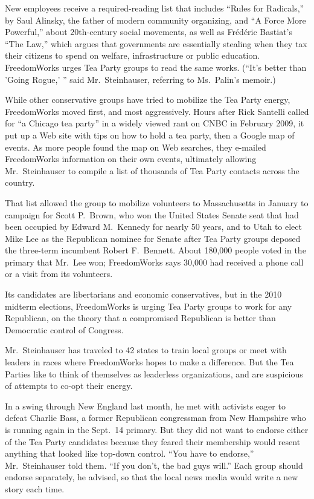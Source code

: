 ﻿\documentclass[12pt]{article}
\begin{document}
New employees receive a required-reading list that includes ``Rules for Radicals,'' by Saul Alinsky,
the father of modern community organizing, and ``A Force More Powerful,'' about 20th-century social
movements, as well as Fr\'ed\'eric Bastiat's ``The Law,'' which argues that governments are
essentially stealing when they tax their citizens to spend on welfare, infrastructure or public
education. FreedomWorks urges Tea Party groups to read the same works. (``It's better than 'Going
Rogue,' '' said Mr.~Steinhauser, referring to Ms.~Palin's memoir.)

While other conservative groups have tried to mobilize the Tea Party energy, FreedomWorks moved
first, and most aggressively. Hours after Rick Santelli called for ``a Chicago tea party'' in a
widely viewed rant on CNBC in February 2009, it put up a Web site with tips on how to hold a tea
party, then a Google map of events. As more people found the map on Web searches, they e-mailed
FreedomWorks information on their own events, ultimately allowing Mr.~Steinhauser to compile a list
of thousands of Tea Party contacts across the country.

That list allowed the group to mobilize volunteers to Massachusetts in January to campaign for Scott
P.~Brown, who won the United States Senate seat that had been occupied by Edward M.~Kennedy for
nearly 50 years, and to Utah to elect Mike Lee as the Republican nominee for Senate after Tea Party
groups deposed the three-term incumbent Robert F.~Bennett. About 180,000 people voted in the primary
that Mr.~Lee won; FreedomWorks says 30,000 had received a phone call or a visit from its volunteers.

Its candidates are libertarians and economic conservatives, but in the 2010 midterm elections,
FreedomWorks is urging Tea Party groups to work for any Republican, on the theory that a compromised
Republican is better than Democratic control of Congress.

Mr.~Steinhauser has traveled to 42 states to train local groups or meet with leaders in races where
FreedomWorks hopes to make a difference. But the Tea Parties like to think of themselves as
leaderless organizations, and are suspicious of attempts to co-opt their energy.

In a swing through New England last month, he met with activists eager to defeat Charlie Bass, a
former Republican congressman from New Hampshire who is running again in the Sept.~14 primary. But
they did not want to endorse either of the Tea Party candidates because they feared their membership
would resent anything that looked like top-down control. ``You have to endorse,'' Mr.~Steinhauser
told them. ``If you don't, the bad guys will.'' Each group should endorse separately, he advised, so
that the local news media would write a new story each time.
\end{document}
